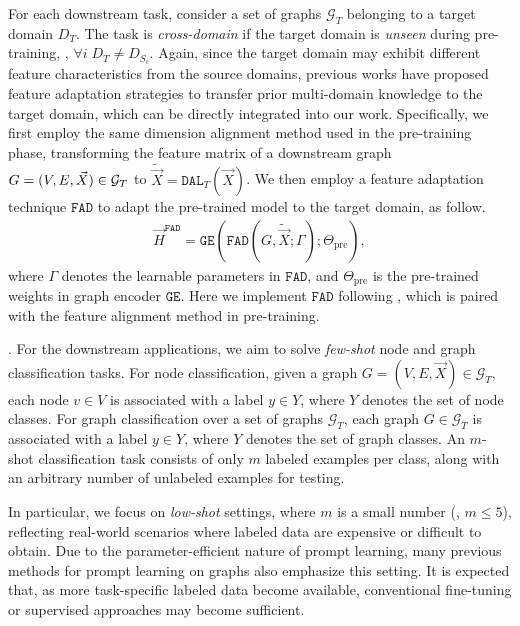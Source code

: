 \label{sec:problem_definition}
For each downstream task, consider a set of graphs \( \mathcal{G}_T \) belonging to a target domain \( D_T \). The task is \emph{cross-domain} if the target domain is \emph{unseen} during pre-training,
\ie, \( \forall i \; D_T \ne D_{S_i} \). Again, since the target domain may exhibit different feature characteristics from the source domains, 
previous works \cite{zhao2024all,yu2024text} have proposed feature adaptation strategies to transfer prior multi-domain knowledge to the target domain, which can be directly integrated into our work.
Specifically, we first employ the same dimension alignment method used in the pre-training phase,
transforming the feature matrix of a downstream graph $G=(V,E,\Vec{X}) \in \mathcal{G}_T$ to $\tilde{\Vec{X}}=\mathtt{DAL}_T(\Vec{X})$\label{eq.target-dimension}. We then employ a feature adaptation technique $\mathtt{FAD}$ to adapt the pre-trained model to the target domain, as follow.
\begin{align}\label{eq.feature-emb}
    \Vec{H}^\mathtt{FAD} = \mathtt{GE}(\mathtt{FAD}(G,\tilde{\Vec{X}};\Gamma);\Theta_\text{pre}),
\end{align}
where $\Gamma$ denotes the learnable parameters in $\mathtt{FAD}$, and $\Theta_\text{pre}$ is the pre-trained weights in graph encoder $\mathtt{GE}$. Here we implement $\mathtt{FAD}$ following  \citet{yu2024text}, which is paired with the feature alignment method in pre-training.

. For the downstream applications, we aim to solve \emph{few-shot} node and graph classification tasks. For node classification, given a graph \( G = (V, E, \vec{X}) \in \mathcal{G}_T \), each node \( v \in V \) is associated with a label \( y \in Y \), where $Y$ denotes the set of node classes. For graph classification over a set of graphs \( \mathcal{G}_T \), each graph \( G \in \mathcal{G}_T \) is associated with a label \( y \in Y \), where $Y$ denotes the set of graph classes. An \( m \)-shot classification task consists of only \( m \) labeled examples per class, along with an arbitrary number of unlabeled examples for testing. 

In particular, we focus on \emph{low-shot} settings, where \( m \) is a small number (\eg, \( m \leq 5 \)), reflecting real-world scenarios where labeled data are expensive or difficult to obtain. Due to the parameter-efficient nature of prompt learning, many previous methods for prompt learning on graphs  \cite{liu2023graphprompt,yu2023generalized,sun2023all,yu2024text,zhao2024all}  also emphasize this setting. It is expected that, as more task-specific labeled data become available, conventional fine-tuning or supervised approaches may become sufficient. 

